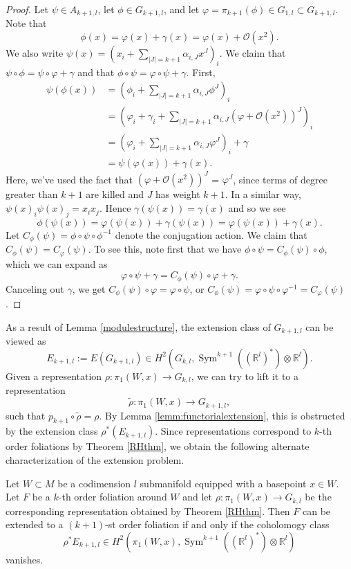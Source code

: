 \documentclass[10pt]{amsart}
\newcommand{\rr}{\mathbb{R}}
\DeclareMathOperator{\Sym}{Sym}
\numberwithin{theoremalpha}{section}
\numberwithin{equation}{section}
\numberwithin{definition}{section}
\numberwithin{theorem}{section}
\numberwithin{proposition}{section}
\numberwithin{lemma}{section}
\numberwithin{example}{section}
\numberwithin{remark}{section}
\numberwithin{corollary}{section}
\numberwithin{question}{section}
\numberwithin{problem}{section}
\numberwithin{assumption}{section}
\theoremstyle{named}
\numberwithin{equation}{section}
\begin{document}
\begin{proof}
Let $\psi \in A_{k+1, l}$, let $\phi \in G_{k+1, l}$, and let $\varphi = \pi_{k+1}(\phi) \in G_{1,l} \subset G_{k+1,l}$. Note that 
\[
\phi(x) = \varphi(x) + \gamma(x) =\varphi(x) + \mathcal{O}(x^2). 
\]
We also write $\psi(x) = (x_{i} + \sum_{|J| = k+1} \alpha_{i, J} x^{J} )_{i}$. We claim that $\psi \circ \phi = \psi \circ \varphi + \gamma$ and that $\phi \circ \psi = \varphi \circ \psi + \gamma$. 
First, 
\begin{align*}
\psi (\phi(x)) &=  (\phi_{i} + \sum_{|J| = k+1} \alpha_{i, J} \phi^{J} )_{i} \\
&= (\varphi_{i} + \gamma_{i} + \sum_{|J| = k+1 } \alpha_{i, J} (\varphi + \mathcal{O}(x^2))^J)_{i} \\
&= (\varphi_{i} + \sum_{|J| = k+1} \alpha_{i, J} \varphi^{J} )_{i} + \gamma \\
&= \psi (\varphi(x)) + \gamma(x). 
\end{align*}
Here, we've used the fact that $ (\varphi + \mathcal{O}(x^2))^J$ = $\varphi^J$, since terms of degree greater than $k+1$ are killed and $J$ has weight $k+1$. In a similar way, $\psi(x)_{i} \psi(x)_{j} = x_{i} x_{j}$. Hence $\gamma(\psi(x)) = \gamma(x)$ and so we see 
\[
\phi(\psi(x)) = \varphi(\psi(x)) + \gamma(\psi(x)) = \varphi(\psi(x)) + \gamma(x). 
\]
Let $C_{\phi}(\psi) = \phi \circ \psi \circ \phi^{-1}$ denote the conjugation action. We claim that $C_{\phi}(\psi) = C_{\varphi}(\psi)$. To see this, note first that we have $\phi \circ \psi = C_{\phi}(\psi) \circ \phi$, which we can expand as 
\[
\varphi \circ \psi + \gamma = C_{\phi}(\psi) \circ \varphi + \gamma. 
\]
Canceling out $\gamma$, we get $C_{\phi}(\psi) \circ \varphi = \varphi \circ \psi$, or $C_{\phi}(\psi) = \varphi \circ \psi \circ \varphi^{-1} = C_{\varphi}(\psi)$.
\end{proof}


As a result of Lemma \ref{modulestructure}, the extension class of $G_{k+1, l}$ can be viewed as 
\[
E_{k+1, l} := E(G_{k+1,l}) \in H^2(G_{k,l}, \Sym^{k+1}((\rr^{l})^*) \otimes \rr^l). 
\]
Given a representation $\rho : \pi_{1}(W, x) \to G_{k,l}$, we can try to lift it to a representation 
\[
\tilde{\rho} : \pi_{1}(W,x) \to G_{k+1,l},
\]
such that $p_{k+1} \circ \tilde{\rho} = \rho$. By Lemma \ref{lemm:functorialextension}, this is obstructed by the extension class $\rho^*(E_{k+1,l})$.  Since representations correspond to $k$-th order foliations by Theorem \ref{RHthm}, we obtain the following alternate characterization of the extension problem. 
\begin{theorem}\label{th:secondextensionclass}
Let $W \subset M$ be a codimension $l$ submanifold equipped with a basepoint $x \in W$. Let $F$ be a $k$-th order foliation around $W$ and let $\rho: \pi_{1}(W,x) \to G_{k,l}$ be the corresponding representation obtained by Theorem \ref{RHthm}. Then $F$ can be extended to a $(k+1)$-st order foliation if and only if the coholomogy class 
\begin{equation*}
\rho^*E_{k+1,l} \in H^2(\pi_1(W,x),\Sym^{k+1}((\rr^{l})^*) \otimes \rr^l)
\end{equation*}
vanishes.
\end{theorem}
\end{document}

